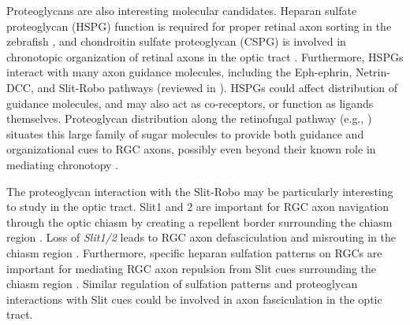 Proteoglycans are also interesting molecular candidates.
Heparan sulfate proteoglycan (HSPG) function is required for proper retinal axon sorting in the zebrafish \cite{lee2004axon}, and chondroitin sulfate proteoglycan (CSPG) is involved in chronotopic organization of retinal axons in the optic tract \cite{leung2003enzymatic}.
Furthermore, HSPGs interact with many axon guidance molecules, including the Eph-ephrin, Netrin-DCC, and Slit-Robo pathways (reviewed in ).
HSPGs could affect distribution of guidance molecules, and may also act as co-receptors, or function as ligands themselves.
Proteoglycan distribution along the retinofugal pathway (e.g., ) situates this large family of sugar molecules to provide both guidance and organizational cues to RGC axons, possibly even beyond their known role in mediating chronotopy \cite{leung2003enzymatic}.

The proteoglycan interaction with the Slit-Robo may be particularly interesting to study in the optic tract.
Slit1 and 2 are important for RGC axon navigation through the optic chiasm by creating a repellent border surrounding the chiasm region \cite{plump2002slit1}.
Loss of \emph{Slit1/2} leads to RGC axon defasciculation and misrouting in the chiasm region \cite{plump2002slit1}. 
Furthermore, specific heparan sulfation patterns on RGCs are important for mediating RGC axon repulsion from Slit cues surrounding the chiasm region \cite{pratt2006heparan}.
Similar regulation of sulfation patterns and proteoglycan interactions with Slit cues could be involved in axon fasciculation in the optic tract.

